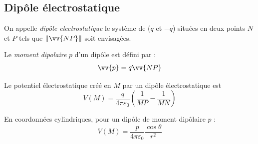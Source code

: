 \documentclass[11pt,a4paper,fleqn,pdftex]{report}
\begin{document}
\subsection{Dipôle électrostatique} %
\label{sub:dipole_electrostatique}
\begin{dfn}
   On appelle \emph{dipôle electrostatique} le système de  ($q$ et $-q$) situées en deux points $N$ et $P$ tels que $\|\vv{NP}\|$ soit  envisagées.
\end{dfn}
\begin{dfn}
   \begin{minipage}{0.5\textwidth}
   Le \emph{moment dipolaire} $p$ d'un dipôle est défini par :
    \begin{equation}
      \vv{p} = q\vv{NP}
    \end{equation}
   \end{minipage}
   \begin{minipage}{0.5\textwidth}
      \begin{center}
      \end{center}
   \end{minipage}
\end{dfn}
\begin{theorem}
   Le potentiel électrostatique créé en $M$ par un dipôle électrostatique est
   \begin{equation}
   V(M) = \dfrac{q}{4\pi\varepsilon_0}\left( \dfrac{1}{MP} - \dfrac{1}{MN} \right) 
   \end{equation}
\end{theorem}
\begin{theorem}
    En coordonnées cylindriques, pour un dipôle de moment dipôlaire $p$ :
   \begin{equation}
   V(M) = \dfrac{p}{4\pi\varepsilon_0} \dfrac{\cos \theta}{r^2}
   \end{equation}
\end{theorem}
\end{document}
